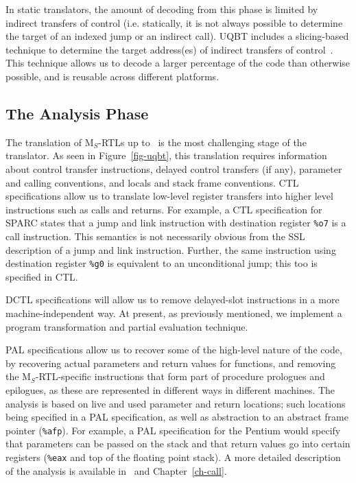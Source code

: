 In static translators, the amount of decoding from this phase 
is limited by indirect transfers of control (i.e. statically,  
it is not always possible to determine the target of an 
indexed jump or an indirect call).  
UQBT includes a slicing-based technique to determine the target
address(es) of indirect transfers of control~\cite{Cifu99c}. 
This technique allows us to decode a larger percentage of the
code than otherwise possible, and is reusable across different 
platforms.  


\subsection{The Analysis Phase} 
The translation of M$_S$-RTLs up to \hrtl\ is 
the most challenging stage of the translator.  As seen in 
Figure~\ref{fig-uqbt}, this translation requires information 
about control transfer instructions, delayed control transfers 
(if any), parameter and calling conventions, and locals and 
stack frame conventions.  
CTL specifications allow us to translate low-level register 
transfers into higher level instructions such as calls and 
returns.  
For example, a CTL specification for SPARC states that a 
jump and link instruction with destination register \texttt{\%o7} 
is a call instruction.  This semantics is not necessarily 
obvious from the SSL description of a jump and link instruction. 
Further, the same instruction using destination register 
\texttt{\%g0} is equivalent to an unconditional jump; this 
too is specified in CTL.  

DCTL specifications will allow us to remove delayed-slot 
instructions in a more machine-independent way.  
At present, as previously mentioned, we implement a program
transformation and partial evaluation technique. 

PAL specifications allow us to recover some of the high-level nature 
of the code, by recovering actual parameters and return 
values for functions, and removing the M$_S$-RTL-specific 
instructions that form part of procedure prologues and 
epilogues, as these are represented in different ways in 
different machines.  The analysis is based on live and 
used parameter and return locations; such locations being
specified in a PAL specification, as well as abstraction to 
an abstract frame pointer (\texttt{\%afp}).  
For example, a PAL specification for the Pentium would specify
that parameters can be passed on the stack and that return 
values go into certain registers (\texttt{\%eax} and top of 
the floating point stack). 
A more detailed description of the analysis is available 
in~\cite{Cifu99g} and Chapter~\ref{ch-call}. 
 
